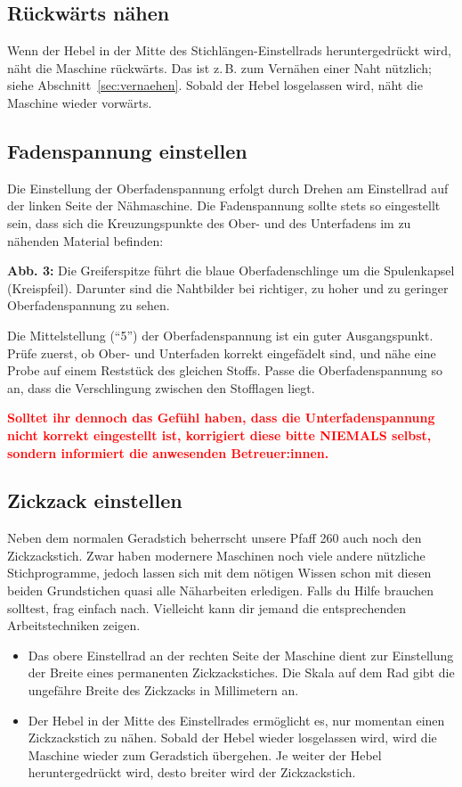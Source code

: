 \documentclass{\basedir/fablab-document}
\begin{document}
\subsection{Rückwärts nähen}
Wenn der Hebel in der Mitte des Stichlängen-Einstellrads heruntergedrückt wird, näht die Maschine rückwärts. Das ist z.\,B. zum Vernähen einer Naht nützlich; siehe Abschnitt~\ref{sec:vernaehen}.
Sobald der Hebel losgelassen wird, näht die Maschine wieder vorwärts.


\pagebreak
\subsection{Fadenspannung einstellen}
Die Einstellung der Oberfadenspannung erfolgt durch Drehen am Einstellrad auf der linken Seite der Nähmaschine.
Die Fadenspannung sollte stets so eingestellt sein, dass sich die Kreuzungspunkte des Ober- und des Unterfadens im zu nähenden Material befinden:
\begin{center}
	\resizebox{0.72\linewidth}{!}{}
	\par{\small \textbf{Abb. 3:} Die Greiferspitze führt die blaue Oberfadenschlinge um die Spulenkapsel (Kreispfeil). Darunter sind die Nahtbilder bei richtiger, zu hoher und zu geringer Oberfadenspannung zu sehen.}
\end{center}
Die Mittelstellung (\enquote{5}) der Oberfadenspannung ist ein guter Ausgangspunkt.
Prüfe zuerst, ob Ober- und Unterfaden korrekt eingefädelt sind, und nähe eine
Probe auf einem Reststück des gleichen Stoffs. Passe die Oberfadenspannung so an,
dass die Verschlingung zwischen den Stofflagen liegt.

\textcolor{red}{\textbf{Solltet ihr dennoch das Gefühl haben, dass die Unterfadenspannung nicht korrekt eingestellt ist, korrigiert diese bitte NIEMALS selbst, sondern informiert die anwesenden Betreuer:innen.}}

\subsection{Zickzack einstellen}
Neben dem normalen Geradstich beherrscht unsere Pfaff 260 auch noch den Zickzackstich.
Zwar haben modernere Maschinen noch viele andere nützliche Stichprogramme, jedoch lassen sich mit dem nötigen Wissen schon mit diesen beiden Grundstichen quasi alle Näharbeiten erledigen. Falls du Hilfe brauchen solltest, frag einfach nach. Vielleicht kann dir jemand die entsprechenden Arbeitstechniken zeigen.
\begin{itemize}
	\item Das obere Einstellrad an der rechten Seite der Maschine dient zur Einstellung der Breite eines permanenten Zickzackstiches. Die Skala auf dem Rad gibt die ungefähre Breite des Zickzacks in Millimetern an.
	\item Der Hebel in der Mitte des Einstellrades ermöglicht es, nur momentan einen Zickzackstich zu nähen.
	Sobald der Hebel wieder losgelassen wird, wird die Maschine wieder zum Geradstich übergehen.
	Je weiter der Hebel heruntergedrückt wird, desto breiter wird der Zickzackstich.
\end{itemize}
\end{document}
